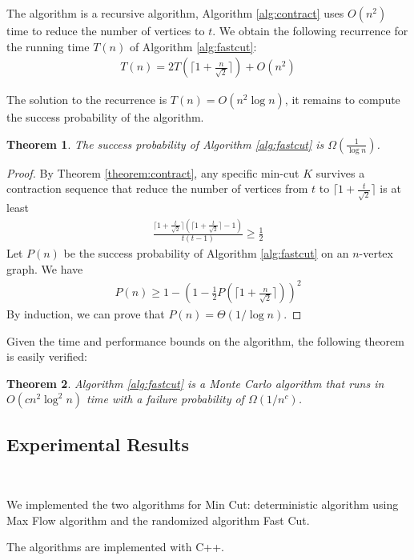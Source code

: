 \documentclass[12pt]{article}
\newtheorem{theorem}{Theorem}
\begin{document}
The algorithm is a recursive algorithm, Algorithm \ref{alg:contract} uses $O(n^2)$ time to reduce the number of vertices to $t$. We obtain the following recurrence for the running time $T(n)$ of Algorithm \ref{alg:fastcut}:
\begin{align*}
    T(n)=2T\left(\lceil 1+\frac{n}{\sqrt{2}}\rceil\right)+O(n^2)
\end{align*}

The solution to the recurrence is $T(n)=O(n^2\log n)$, it remains to compute the success probability of the algorithm. 

\begin{theorem}
    The success probability of Algorithm \ref{alg:fastcut} is $\Omega(\frac{1}{\log n})$.
\end{theorem}
\begin{proof}
    By Theorem \ref{theorem:contract}, any specific min-cut $K$ survives a contraction sequence that reduce the number of vertices from $t$ to $\lceil 1+\frac{t}{\sqrt{2}}\rceil$ is at least
    \begin{align*}
        \frac{\lceil 1+\frac{t}{\sqrt{2}}\rceil(\lceil 1+\frac{t}{\sqrt{2}}\rceil-1)}{t(t-1)}\geq \frac{1}{2}
    \end{align*}
    Let $P(n)$ be the success probability of Algorithm \ref{alg:fastcut} on an $n$-vertex graph. We have
    \begin{align*}
        P(n)\geq 1-\left(1-\frac{1}{2}P\left(\lceil 1+\frac{n}{\sqrt{2}}\rceil\right)\right)^2
    \end{align*}
    By induction, we can prove that $P(n)=\Theta(1/\log n)$.
\end{proof}
Given the time and performance bounds on the algorithm, the following theorem is easily verified:

\begin{theorem}
    Algorithm \ref{alg:fastcut} is a Monte Carlo algorithm that runs in $O(cn^2\log^2 n)$ time with a failure probability of $\Omega(1/n^c)$.
\end{theorem}

\subsection{Experimental Results}\

We implemented the two algorithms for Min Cut: deterministic algorithm using Max Flow algorithm and the randomized algorithm Fast Cut.

The algorithms are implemented with C++.
\end{document}
